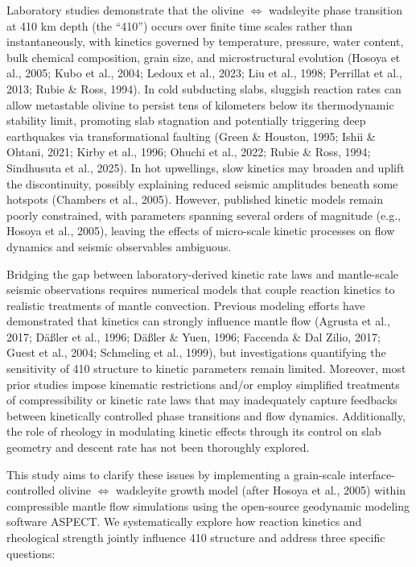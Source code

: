 \documentclass[draft,linenumbers]{agujournal2019}
\begin{document}
Laboratory studies demonstrate that the olivine \(\Leftrightarrow\)
wadsleyite phase transition at 410 km depth (the ``410'') occurs over
finite time scales rather than instantaneously, with kinetics governed
by temperature, pressure, water content, bulk chemical composition,
grain size, and microstructural evolution (Hosoya et al., 2005; Kubo et
al., 2004; {Ledoux et al.}, 2023; Liu et al., 1998; Perrillat et al.,
2013; Rubie \& Ross, 1994). In cold subducting slabs, sluggish reaction
rates can allow metastable olivine to persist tens of kilometers below
its thermodynamic stability limit, promoting slab stagnation and
potentially triggering deep earthquakes via transformational faulting
(Green \& Houston, 1995; Ishii \& Ohtani, 2021; Kirby et al., 1996;
Ohuchi et al., 2022; Rubie \& Ross, 1994; Sindhusuta et al., 2025). In
hot upwellings, slow kinetics may broaden and uplift the discontinuity,
possibly explaining reduced seismic amplitudes beneath some hotspots
(Chambers et al., 2005). However, published kinetic models remain poorly
constrained, with parameters spanning several orders of magnitude (e.g.,
Hosoya et al., 2005), leaving the effects of micro-scale kinetic
processes on flow dynamics and seismic observables ambiguous.

Bridging the gap between laboratory-derived kinetic rate laws and
mantle-scale seismic observations requires numerical models that couple
reaction kinetics to realistic treatments of mantle convection. Previous
modeling efforts have demonstrated that kinetics can strongly influence
mantle flow (Agrusta et al., 2017; Däßler et al., 1996; Däßler \& Yuen,
1996; Faccenda \& Dal Zilio, 2017; Guest et al., 2004; Schmeling et al.,
1999), but investigations quantifying the sensitivity of 410 structure
to kinetic parameters remain limited. Moreover, most prior studies
impose kinematic restrictions and/or employ simplified treatments of
compressibility or kinetic rate laws that may inadequately capture
feedbacks between kinetically controlled phase transitions and flow
dynamics. Additionally, the role of rheology in modulating kinetic
effects through its control on slab geometry and descent rate has not
been thoroughly explored.

This study aims to clarify these issues by implementing a grain-scale
interface-controlled olivine \(\Leftrightarrow\) wadsleyite growth model
(after Hosoya et al., 2005) within compressible mantle flow simulations
using the open-source geodynamic modeling software ASPECT. We
systematically explore how reaction kinetics and rheological strength
jointly influence 410 structure and address three specific questions:
\end{document}
